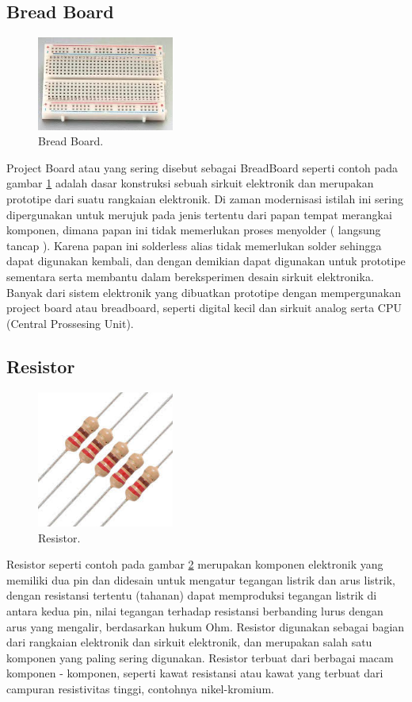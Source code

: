 \subsection{Bread Board}
\begin{figure}[ht]
\centerline{\includegraphics[width=0.4\textwidth]{figures/breadboard.jpg}}
\caption{Bread Board.}
\label{breadboard}
\end{figure}
Project Board atau yang sering disebut sebagai BreadBoard seperti contoh pada gambar \ref{breadboard} adalah dasar konstruksi sebuah sirkuit elektronik dan merupakan prototipe dari suatu rangkaian elektronik. Di zaman modernisasi istilah ini sering dipergunakan untuk merujuk pada jenis tertentu dari papan tempat merangkai komponen, dimana papan ini tidak memerlukan proses menyolder ( langsung tancap ).
Karena papan ini solderless alias tidak memerlukan solder sehingga dapat digunakan kembali, dan dengan demikian dapat digunakan untuk prototipe sementara serta membantu dalam bereksperimen desain sirkuit elektronika. Banyak dari sistem elektronik yang dibuatkan prototipe dengan mempergunakan project board atau breadboard, seperti digital kecil dan sirkuit analog serta CPU (Central Prossesing Unit).

\subsection{Resistor}
\begin{figure}[ht]
\centerline{\includegraphics[width=0.4\textwidth]{figures/resistor.jpg}}
\caption{Resistor.}
\label{resistor}
\end{figure}
Resistor seperti contoh pada gambar \ref{resistor} merupakan komponen elektronik yang memiliki dua pin dan didesain untuk mengatur tegangan listrik dan arus listrik, dengan resistansi tertentu (tahanan) dapat memproduksi tegangan listrik di antara kedua pin, nilai tegangan terhadap resistansi berbanding lurus dengan arus yang mengalir, berdasarkan hukum Ohm.
Resistor digunakan sebagai bagian dari rangkaian elektronik dan sirkuit elektronik, dan merupakan salah satu komponen yang paling sering digunakan. Resistor terbuat dari berbagai macam komponen - komponen, seperti kawat resistansi atau kawat yang terbuat dari campuran resistivitas tinggi, contohnya nikel-kromium.



